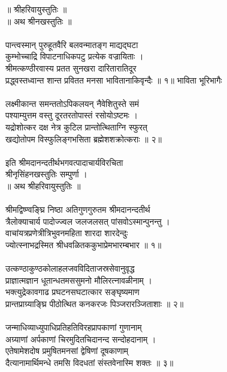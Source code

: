 ॥ श्रीहरिवायुस्तुतिः ॥ \\
॥ अथ श्रीनखस्तुतिः ॥  \\
\\
पान्त्वस्मान् पुरुहूतवैरि बलवन्मातङ्ग माद्यद्घटा\\
     कुम्भोच्चाद्रि विपाटनाधिकपटु प्रत्येक वज्रायिताः ।\\
श्रीमत्कण्ठीरवास्य प्रतत सुनखरा दारितारातिदूर\\
     प्रद्ध्वस्तध्वान्त शान्त प्रवितत मनसा भावितानाकिवृन्दैः ॥ १॥ भाविता भूरिभागैः\\
\\
लक्ष्मीकान्त समन्ततोऽपिकलयन् नैवेशितुस्ते समं\\
     पश्याम्युत्तम वस्तु दूरतरतोपास्तं रसोयोऽष्टमः ।\\
यद्रोशोत्कर दक्ष नेत्र कुटिल प्रान्तोत्थिताग्नि स्फुरत्\\
     खद्योतोपम विस्फुलिङ्गभसिता ब्रह्मेशशक्रोत्कराः ॥ २॥\\
\\
          इति श्रीमदानन्दतीर्थभगवत्पादाचार्यविरचिता\\
          श्रीनृसिंहनखस्तुतिः सम्पुर्णा ।\\
 ॥ अथ श्रीहरिवायुस्तुतिः ॥\\
\\
श्रीमद्विष्ण्वङ्घ्रि निष्ठा अतिगुणगुरुतम श्रीमदानन्दतीर्थ\\
     त्रैलोक्याचार्य पादोज्ज्वल जलजलसत् पांसवोऽस्मान्पुनन्तु ।\\
वाचांयत्रप्रणेत्रीत्रिभुवनमहिता शारदा शारदेन्दुः\\
     ज्योत्स्नाभद्रस्मित श्रीधवळितककुभाप्रेमभारम्बभार ॥ १॥\\
\\
उत्कण्ठाकुण्ठकोलाहलजवविदिताजस्रसेवानुवृद्ध\\
     प्राज्ञात्मज्ञान धूतान्धतमससुमनो मौलिरत्नावळीनाम् ।\\
भक्त्युद्रेकावगाढ प्रघटनसघटात्कार सङ्घृष्यमाण\\
     प्रान्तप्राग्र्याङ्घ्रि पीठोत्थित कनकरजः पिञ्जरारञ्जिताशाः ॥ २॥\\
\\
जन्माधिव्याध्युपाधिप्रतिहतिविरहप्रापकाणां गुणानाम्\\
     अग्र्याणां अर्पकाणां चिरमुदितचिदानन्द सन्दोहदानाम् ।\\
एतेषामेशदोष प्रमुषितमनसां द्वेषिणां दूषकाणाम्\\
     दैत्यानामार्थिमन्धे तमसि विदधतां संस्तवेनास्मि शक्तः ॥ ३॥\\
\\

